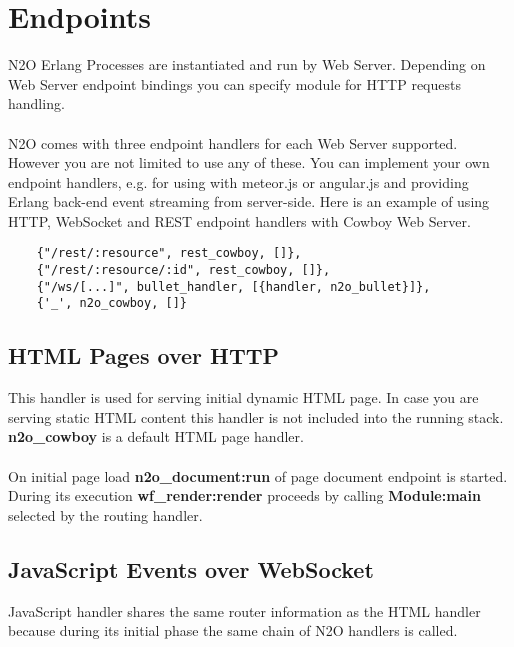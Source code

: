 \section{Endpoints}
N2O Erlang Processes are instantiated and run by Web Server.
Depending on Web Server endpoint bindings you can specify
module for HTTP requests handling.

\paragraph{}
N2O comes with three endpoint handlers for each Web Server supported.
However you are not limited to use any of these.
You can implement your own endpoint handlers, e.g. for using with
meteor.js or angular.js and providing Erlang back-end event streaming
from server-side. Here is an example of using HTTP, WebSocket and
REST endpoint handlers with Cowboy Web Server.

\vspace{1\baselineskip}
\begin{lstlisting}
    {"/rest/:resource", rest_cowboy, []},
    {"/rest/:resource/:id", rest_cowboy, []},
    {"/ws/[...]", bullet_handler, [{handler, n2o_bullet}]},
    {'_', n2o_cowboy, []}
\end{lstlisting}

\subsection{HTML Pages over HTTP}
This handler is used for serving initial dynamic HTML page.
In case you are serving static HTML content this handler is
not included into the running stack. {\bf {n2o}\_{cowboy}} is
a default HTML page handler.

\paragraph{}
On initial page load {\bf {n2o}\_{document}:run} of page document endpoint is started.
During its execution {\bf {wf}\_{render}:render} proceeds
by calling {\bf Module:main} selected by the routing handler.

\subsection{JavaScript Events over WebSocket}
JavaScript handler shares the same router information as the
HTML handler because during its initial phase the same chain
of N2O handlers is called.

